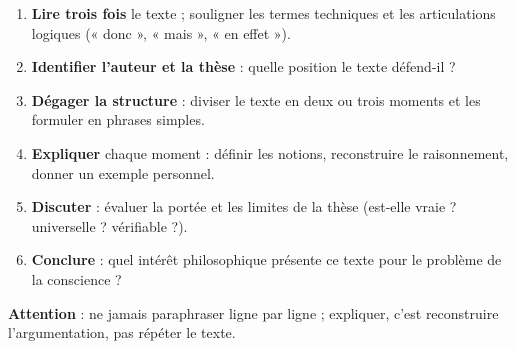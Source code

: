 \documentclass[11pt]{article}
\begin{document}
\begin{methode}
\begin{enumerate}
\item \textbf{Lire trois fois} le texte ; souligner les termes techniques et les articulations logiques (« donc », « mais », « en effet »).
\item \textbf{Identifier l'auteur et la thèse} : quelle position le texte défend-il ?
\item \textbf{Dégager la structure} : diviser le texte en deux ou trois moments et les formuler en phrases simples.
\item \textbf{Expliquer} chaque moment : définir les notions, reconstruire le raisonnement, donner un exemple personnel.
\item \textbf{Discuter} : évaluer la portée et les limites de la thèse (est-elle vraie ? universelle ? vérifiable ?).
\item \textbf{Conclure} : quel intérêt philosophique présente ce texte pour le problème de la conscience ?
\end{enumerate}
\textbf{Attention} : ne jamais paraphraser ligne par ligne ; expliquer, c'est reconstruire l'argumentation, pas répéter le texte.
\end{methode}
\end{document}
